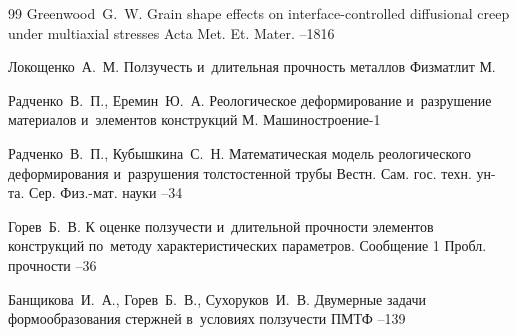 \begin{thebibliography}{99}
\by Greenwood~G.~W.
\paper Grain shape effects on interface-controlled diffusional creep under multiaxial stresses
\jour Acta Met. Et. Mater.
--1816

\by Локощенко~А.~М.
\book Ползучесть и~длительная прочность металлов
\publ Физматлит
\publaddr М.

\by Радченко~В.~П., Еремин~Ю.~А.
\book Реологическое деформирование и~разрушение материалов и~элементов конструкций
\publaddr М.
\publ Машиностроение-1

\by Радченко~В.~П., Кубышкина~С.~Н.
\paper Математическая модель реологического деформирования и~разрушения толстостенной трубы
\jour Вестн. Сам. гос. техн. ун-та. Сер. Физ.-мат. науки
--34


\by Горев~Б.~В.
\paper К оценке ползучести и~длительной прочности элементов конструкций по~методу характеристических параметров. Сообщение 1
\jour Пробл. прочности
--36

\by Банщикова~И.~А., Горев~Б.~В., Сухоруков~И.~В.
\paper Двумерные задачи формообразования стержней в~условиях ползучести
\jour ПМТФ
--139


\end{thebibliography}
